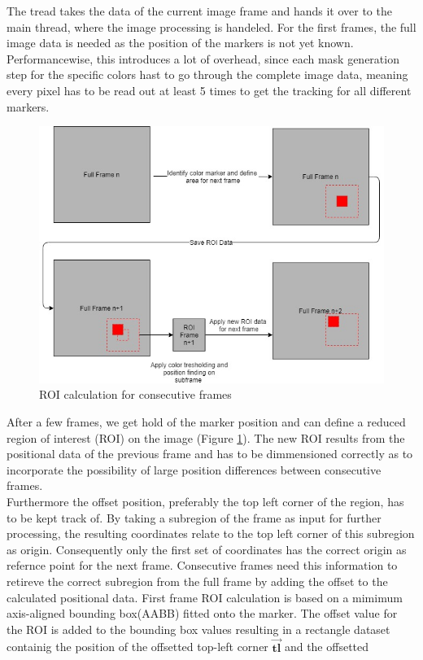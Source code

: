 The tread takes the data of the current image frame and hands it over to the main thread, where the image processing is handeled. For the first frames, the full image data is needed as the position of the markers is not yet known. Performancewise, this introduces a lot of overhead, since each mask generation step for the specific colors hast to go through the complete image data, meaning every pixel has to be read out at least 5 times to get the tracking for all different markers.\\
\begin{figure}[H]
\includegraphics[width=\textwidth]{images/ROI.jpg}
\caption{ROI calculation for consecutive frames}
\label{roi_calc} 
\end{figure}
After a few frames, we get hold of the marker position and can define a reduced region of interest (ROI) on the image (Figure \ref{roi_calc}). The new ROI results from the positional data of the previous frame and has to be dimmensioned correctly as to incorporate the possibility of large position differences between consecutive frames.\\
Furthermore the offset position, preferably the top left corner of the region, has to be kept track of. By taking a subregion of the frame as input for further processing, the resulting coordinates relate to the top left corner of this subregion as origin. Consequently only the first set of coordinates has the correct origin as refernce point for the next frame. Consecutive frames need this information to retireve the correct subregion from the full frame by adding the offset to the calculated positional data.
First frame ROI calculation is based on a mimimum axis-aligned bounding box(AABB) fitted onto the marker. The offset value for the ROI is added to the bounding box values resulting in a rectangle dataset containig the position of the offsetted top-left corner $\vec{\mathbf{tl}}$ and the offsetted 
